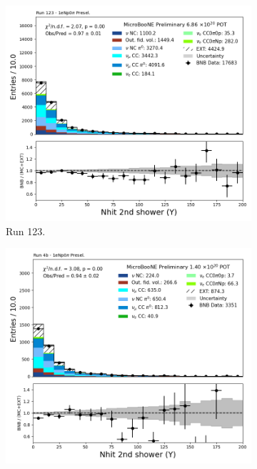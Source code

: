 \begin{figure}[H]
    \centering
    \begin{subfigure}[t]{0.32\linewidth}
        \includegraphics[width=\linewidth]{technote/Appendix_Preselection/Figures/1eNp0pi/Run123/secondshower_Y_nhit_Run123_1eNp0pi_Presel.png}
        \caption{Run 123.}
    \end{subfigure}%
    \hspace{0.2cm}%
    \begin{subfigure}[t]{0.32\linewidth}
        \includegraphics[width=\linewidth]{technote/Appendix_Preselection/Figures/1eNp0pi/Run4b/secondshower_Y_nhit_Run4b_1eNp0pi_Presel.png}

\end{subfigure}
\end{figure}

